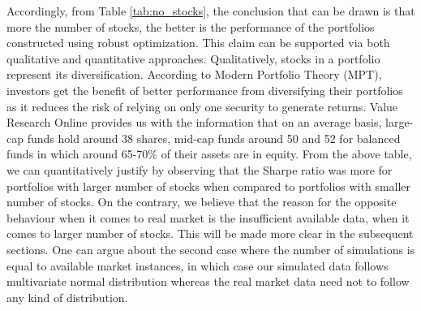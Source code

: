 Accordingly, from Table \ref{tab:no_stocks}, the conclusion that can be drawn is that more the number of stocks, the better is the performance of the portfolios constructed using robust optimization. This claim can be supported via both qualitative and quantitative approaches. Qualitatively, stocks in a portfolio represent its diversification. According to Modern Portfolio Theory (MPT), investors get the benefit of better performance from diversifying their portfolios as it reduces the risk of relying on only one security to generate returns. Value Research Online \cite{vro} provides us with the information that on an average basis, large-cap funds hold around 38 shares, mid-cap funds around 50 and 52 for balanced funds in which around 65-70\% of their assets are in equity. From the above table, we can quantitatively justify by observing that the Sharpe ratio was more for portfolios with larger number of stocks when compared to portfolios with smaller number of stocks. On the contrary, we believe that the reason for the opposite behaviour when it comes to real market is the insufficient available data, when it comes to larger number of stocks. This will be made more clear in the subsequent sections. One can argue about the second case where the number of simulations is equal to available market instances, in which case our simulated data follows multivariate normal distribution whereas the real market data need not to follow any kind of distribution.

